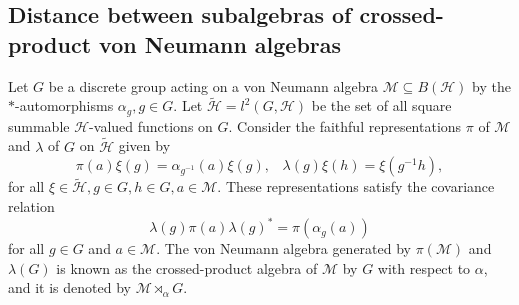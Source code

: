 \documentclass{amsart}
\numberwithin{equation}{section}
\newcommand{\mcal}{\mathcal}
\newcommand{\1}{\mathbf{1}}
\begin{document}
\subsection{Distance between subalgebras of crossed-product von Neumann algebras}\label{crossedv}
Let $G$ be a discrete group acting on a von Neumann algebra $\mcal{M}
\subseteq B(\mcal{H}) $ by the $*$-automorphisms $\alpha_{g}, g\in
G$. Let $\mcal{\tilde{H}}= l^{2}(G,\mcal{H})$ be the set of all square
summable $\mcal{H}$-valued functions on $G$. Consider the faithful
representations $\pi$ of $\mcal{M}$ and $\lambda$ of $G$ on
$\mcal{\tilde{H}}$ given by
\[
\pi(a)\xi(g)= \alpha_{g^{-1}}(a)\xi(g),\,\,\,\,\,
\lambda(g)\xi(h)= \xi(g^{-1}h),
\]
for all $\xi \in \mcal{\tilde{H}}, g\in G, h\in G, a\in
\mcal{M}$. These representations satisfy the covariance relation
\[
\lambda(g)\pi(a)\lambda(g)^{*}= \pi(\alpha_{g}(a))
\]
for all $g\in G$ and $a\in \mcal{M}$. The von Neumann algebra
generated by $\pi(\mcal{M})$ and $\lambda(G)$ is known as the
crossed-product algebra of $\mcal{M}$ by $G$ with respect to $\alpha$,
and it is denoted by $\mcal{M} \rtimes_{\alpha}G$.
\end{document}
